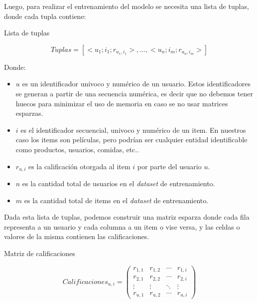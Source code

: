 \documentclass[11pt,a4paper,twoside]{thesis}
\begin{document}
\clearpage
Luego, para realizar el entrenamiento del modelo se necesita una lista de tuplas, donde cada tupla contiene:

\begin{description}
	\item[Lista de tuplas]
\end{description}
\begin{equation*}
	Tuplas = [<u_1; i_1; r_{u_1, i_1}>,...,<u_n; i_m; r_{u_n, i_m}>]
\end{equation*}
\begin{description}
	\item[Donde:]
\end{description}
\begin{itemize}
	\item $u$ es un identificador univoco y numérico de un usuario. Estos identificadores se generan a partir de una secuencia numérica, es decir que no debemos tener huecos para minimizar el uso de memoria en caso se no usar matrices esparzas. 
	\item $i$ es el identificador secuencial, univoco y numérico de un item. En nuestros caso los items son películas, pero podrían ser cualquier entidad identificable como productos, usuarios, comidas, etc.. 
	\item $r_{u, i}$ es la calificación otorgada al item $i$ por parte del usuario $u$. 
 	\item $n$ es la cantidad total de usuarios en el \textit{dataset} de entrenamiento. 
  	\item $m$ es la cantidad total de items en el \textit{dataset} de entrenamiento. 
\end{itemize}

Dada esta lista de tuplas, podemos construir una matriz esparza donde cada fila representa a un usuario y cada columna a un item o vise versa, y las celdas o valores de la misma contienen las calificaciones.


\begin{description}
	\item[Matriz de calificaciones]
\end{description}
\begin{equation*}
	Calificaciones_{u,i} =
	\begin{pmatrix}
	r_{1,1} & r_{1,2} & \cdots & r_{1,i} \\
	r_{2,1} & r_{2,2} & \cdots & r_{2,i} \\
	\vdots  & \vdots  & \ddots & \vdots  \\
	r_{u,1} & r_{u,2} & \cdots & r_{u,i}
	\end{pmatrix}
\end{equation*}
\end{document}
